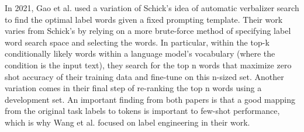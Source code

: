 \hfill \break
In 2021, Gao et al. \cite{gao-etal-2021-making} used a variation of Schick's idea of automatic verbalizer search to find the optimal label words given a fixed prompting template. Their work varies from Schick's by relying on a more brute-force method of specifying label word search space and selecting the words. In particular, within the top-k conditionally likely words within a language model's vocabulary (where the condition is the input text), they search for the top n words that maximize zero shot accuracy of their training data and fine-tune on this n-sized set. Another variation comes in their final step of re-ranking the top n words using a development set. An important finding from both papers is that a good mapping from the original task labels to tokens is important to few-shot performance, which is why Wang et al. \cite{Wang} focused on label engineering in their work.





